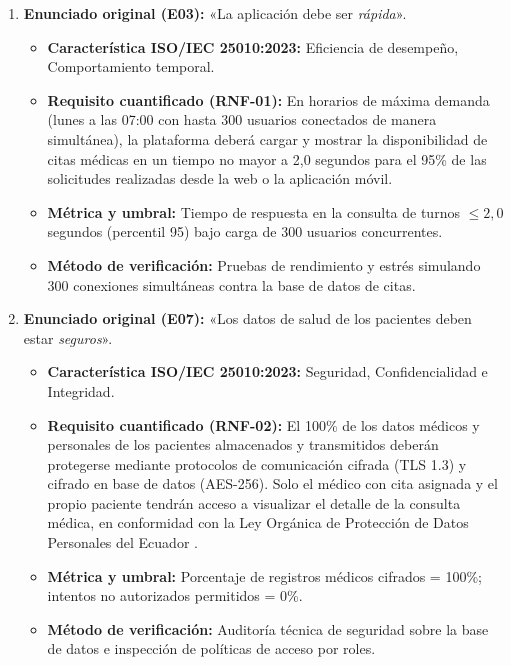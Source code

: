 \documentclass[11pt,a4paper]{article}
\begin{document}
\begin{enumerate}
    \item \textbf{Enunciado original (E03):} «La aplicación debe ser \textit{rápida}».
    \begin{itemize}
        \item \textbf{Característica ISO/IEC 25010:2023:} Eficiencia de desempeño, Comportamiento temporal.
        \item \textbf{Requisito cuantificado (RNF-01):} En horarios de máxima demanda (lunes a las 07:00 con hasta 300 usuarios conectados de manera simultánea), la plataforma deberá cargar y mostrar la disponibilidad de citas médicas en un tiempo no mayor a 2,0 segundos para el 95\% de las solicitudes realizadas desde la web o la aplicación móvil.
        \item \textbf{Métrica y umbral:} Tiempo de respuesta en la consulta de turnos $\le 2,0$ segundos (percentil 95) bajo carga de 300 usuarios concurrentes.
        \item \textbf{Método de verificación:} Pruebas de rendimiento y estrés simulando 300 conexiones simultáneas contra la base de datos de citas.
    \end{itemize}

    \item \textbf{Enunciado original (E07):} «Los datos de salud de los pacientes deben estar \textit{seguros}».
    \begin{itemize}
        \item \textbf{Característica ISO/IEC 25010:2023:} Seguridad, Confidencialidad e Integridad.
        \item \textbf{Requisito cuantificado (RNF-02):} El 100\% de los datos médicos y personales de los pacientes almacenados y transmitidos deberán protegerse mediante protocolos de comunicación cifrada (TLS 1.3) y cifrado en base de datos (AES-256). Solo el médico con cita asignada y el propio paciente tendrán acceso a visualizar el detalle de la consulta médica, en conformidad con la Ley Orgánica de Protección de Datos Personales del Ecuador \cite{asamblea2021}.
        \item \textbf{Métrica y umbral:} Porcentaje de registros médicos cifrados = 100\%; intentos no autorizados permitidos = 0\%.
        \item \textbf{Método de verificación:} Auditoría técnica de seguridad sobre la base de datos e inspección de políticas de acceso por roles.
    \end{itemize}


\end{enumerate}
\end{document}
